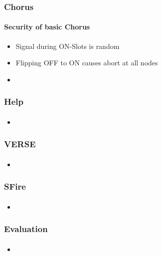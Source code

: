 \documentclass{beamer}
\begin{document}
\begin{frame}
	\frametitle{Chorus}
	\framesubtitle{Security of basic Chorus}
	\begin{itemize}
		\item Signal during ON-Slots is random
		\item Flipping OFF to ON causes abort at all nodes
		\item 
	\end{itemize}
\end{frame}


\begin{frame}
	\frametitle{Help}
	\framesubtitle{}
	\begin{itemize}
		\item 
	\end{itemize}
\end{frame}

\begin{frame}
	\frametitle{VERSE}
	\framesubtitle{}
	\begin{itemize}
		\item 
	\end{itemize}
\end{frame}

\begin{frame}
	\frametitle{SFire}
	\framesubtitle{}
	\begin{itemize}
		\item 
	\end{itemize}
\end{frame}

\begin{frame}
	\frametitle{Evaluation}
	\framesubtitle{}
	\begin{itemize}
		\item 
	\end{itemize}
\end{frame}
\end{document}
